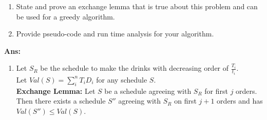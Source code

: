 \documentclass[11pt]{article}
\begin{document}
\begin{enumerate}
    \item State and prove an exchange lemma that is true about this problem and can be used for a greedy algorithm. 
    \item Provide pseudo-code and run time analysis for your algorithm.
\end{enumerate}
\textbf{Ans:}
\begin{enumerate}
    \item Let $S_R$ be the schedule to make the drinks with decreasing order of $\frac{T_i}{t_i}$.\\ Let $Val(S) = \sum_{i}^n T_i D_i$ for any schedule $S$.\\
    \textbf{Exchange Lemma: } Let $S$ be a schedule agreeing with $S_R$ for first $j$ orders. Then there exists a schedule $S''$ agreeing with $S_R$ on first $j+1$ orders and has $Val(S'') \leq Val(S)$.
    

\end{enumerate}
\end{document}
